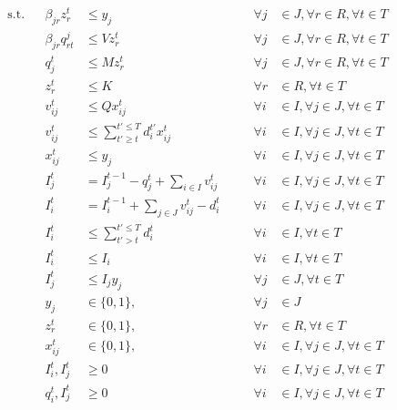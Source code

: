 \documentclass[12pt, a4paper]{article}
\begin{document}
\begin{align}
\text{s.t.} &&\beta_{jr} z^t_r 	&\leq y_j 									&\forall j&\in J, \forall r\in R, \forall t\in T\label{routeonselecteddepot}\\
		&&\beta_{jr}q^j_{rt} 	&\leq V z^t_r 										&\forall j&\in J, \forall r\in R, \forall t\in T\label{novehicleifrouteisnotopened}\\
		&&q^t_j 						&\leq M z^t_r 								&\forall j&\in J, \forall r\in R, \forall t\in T\label{capacityonroute}\\
		&&z^t_r 						&\leq K 									&\forall r&\in R,\forall t\in T\label{fleetsize}\\
		&&v^t_{ij}						&\leq Q x^t_{ij}								&\forall i&\in I, \forall j\in J, \forall t\in T\label{demandsatcustomer}\\
		&&v^t_{ij} 					&\leq \sum_{t'\geq t}^{t'\leq T} d^{t'}_i x^t_{ij}				&\forall i&\in I,\forall j\in J,\forall t\in T\label{demandsatcustomer1}\\
		&&x^t_{ij} 					&\leq y_j 									&\forall i&\in I, \forall j\in J, \forall t\in T\label{customerservedfromdepot}\\
		&&I^t_j 						&=I^{t-1}_j-q^t_j+\sum_{i\in I}v^t_{ij}\qquad 		&\forall i&\in I, \forall j\in J, \forall t\in T\label{flowconversationatdepot}\\
		&&I^t_i 						&=I^{t-1}_i+ \sum_{j\in J} v^t_{ij} - d^t_i 			&\forall i&\in I, \forall j\in J, \forall t\in T\label{flowconversationatcustomer}\\
		&&I^t_i 						&\leq\sum_{t'>t}^{t'\leq T} d^t_i 						&\forall i&\in I, \forall t\in T\label{maxinventory}\\
        &&I^t_i						&\leq I_i									&\forall i&\in I, \forall t\in T\label{capacityatcustomers}\\
       	&&I^t_j						&\leq I_j y_j									&\forall j&\in J, \forall t\in T\label{capacityatdepot}\\
        &&y_j						&\in\{0,1\}, 								&\forall j &\in J\label{boolean var1}\\
   		&&z^t_r 						&\in \{0,1\},	 							&\forall r &\in R, \forall t\in T\label{boolean var2}\\
		&&x^t_{ij} 					&\in \{0,1\}, 								&\forall i &\in I, \forall j\in J,\forall t\in T\label{boolean var3}\\
		&&I^t_i, I^t_j					&\geq 0 									&\forall i&\in I, \forall j\in J,\forall t\in T\label{const1}\\	
		&&q^t_i, I^t_j					&\geq 0 									&\forall i&\in I, \forall j\in J,\forall t\in T\label{const2}				
\end{align}
\end{document}
